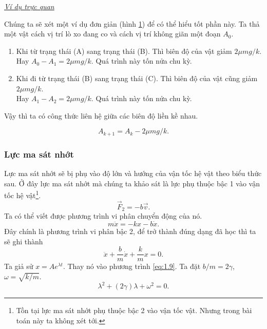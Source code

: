 \underline{\textit{Ví dụ trực quan}}

Chúng ta sẽ xét một ví dụ đơn giản (hình \ref{fig:1.5}) để có thể hiểu tốt phần này. Ta thả một vật cách vị trí lò xo đang co và cách vị trí không giãn một đoạn $A_0$.
\vspace{2mm}

\begin{enumerate}[label = \textbullet]
    \item Khi từ trạng thái (A) sang trạng thái (B). Thì biên độ của vật giảm \(2\mu mg/k \). \\ Hay \(A_0 - A_1 = 2 \mu mg/k\). Quá trình này tốn nửa chu kỳ.
    \item Khi đi từ trạng thái (B) sang trạng thái (C). Thì biên độ của vật cũng giảm \(2\mu mg/k \). \\ Hay \(A_1 - A_2 = 2 \mu mg/k\). Quá trình này tốn nửa chu kỳ.
\end{enumerate}




\begin{figure}[!htb]
    \centering
    \scalebox{0.8}{}
    \caption{}
    \label{fig:1.5}
\end{figure}

Vậy thì ta có công thức liên hệ giữa các biên độ liền kề nhau.

\begin{equation}
    A_{k+1} = A_{k} - 2 \mu mg/k.
\end{equation}


\subsubsection{Lực ma sát nhớt}
\label{sec:1.2.2}

\begin{figure}[!htb]
    \centering
    
    \caption{}
\end{figure}

Lực ma sát nhớt sẽ bị phụ vào độ lớn và hướng của vận tốc hệ vật theo biểu thức sau. Ở đây lực ma sát nhớt mà chúng ta khảo sát là lực phụ thuộc bậc 1 vào vận tốc hệ vật\footnote{Tồn tại lực ma sát nhớt phụ thuộc bậc 2 vào vận tốc vật. Nhưng trong bài toán này ta không xét tới.}. 
\begin{equation}
    \vec{F}_2 = - b \vec{v}.
    \label{eq:1.8}
\end{equation}
Ta có thể viết được phương trình vi phân chuyển động của nó.
\begin{equation*}
    m \ddot{x} = - k x - b \dot{x}.
\end{equation*}
Đây chính là phương trình vi phân bậc 2, để trở thành đúng dạng đã học thì ta sẽ ghi thành
\begin{equation}
    \ddot{x} + {\displaystyle \frac{b}{m}} \dot{x} + {\displaystyle \frac{k}{m}} x = 0. 
    \label{eq:1.9}
\end{equation}
Ta giả sử \(x = A e^{\lambda t}\). Thay nó vào phương trình \ref{eq:1.9}. Ta đặt \(b/m = 2 \gamma\), \(\omega = \sqrt{k/m}\).
\begin{equation*}
    \lambda^2 + (2\gamma) \lambda + \omega^2 = 0.
\end{equation*}

